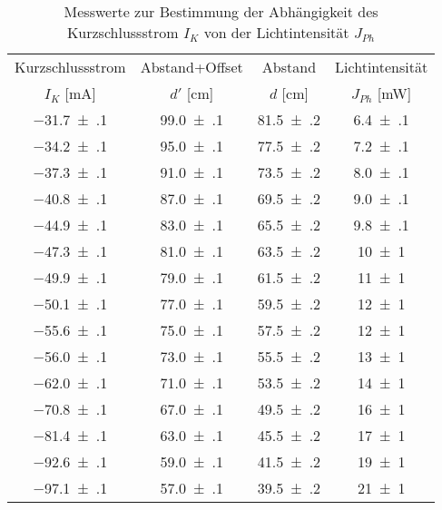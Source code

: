 \begin{table}[!h]
	\centering
	\begin{tabular}{|c|c|c|c|}
		\hline
		Kurzschlussstrom & Abstand+Offset & Abstand & Lichtintensität\\
		$I_{K}$ [\si{\milli\ampere}] & $d'$ [\si{\cm}] & $d$ [\si{\cm}] & $J_{Ph}$ [\si{\milli\watt}]\\
\hline\hline
		\num{-31.7(1)} & \num{99.0(1)} & \num{81.5(2)} & \num{6.4(1)}\\
		\num{-34.2(1)} & \num{95.0(1)} & \num{77.5(2)} & \num{7.2(1)}\\
		\num{-37.3(1)} & \num{91.0(1)} & \num{73.5(2)} & \num{8.0(1)}\\
		\num{-40.8(1)} & \num{87.0(1)} & \num{69.5(2)} & \num{9.0(1)}\\
		\num{-44.9(1)} & \num{83.0(1)} & \num{65.5(2)} & \num{9.8(1)}\\
		\num{-47.3(1)} & \num{81.0(1)} & \num{63.5(2)} & \num{10(1)}\\
		\num{-49.9(1)} & \num{79.0(1)} & \num{61.5(2)} & \num{11(1)}\\
		\num{-50.1(1)} & \num{77.0(1)} & \num{59.5(2)} & \num{12(1)}\\
		\num{-55.6(1)} & \num{75.0(1)} & \num{57.5(2)} & \num{12(1)}\\
		\num{-56.0(1)} & \num{73.0(1)} & \num{55.5(2)} & \num{13(1)}\\
		\num{-62.0(1)} & \num{71.0(1)} & \num{53.5(2)} & \num{14(1)}\\
		\num{-70.8(1)} & \num{67.0(1)} & \num{49.5(2)} & \num{16(1)}\\
		\num{-81.4(1)} & \num{63.0(1)} & \num{45.5(2)} & \num{17(1)}\\
		\num{-92.6(1)} & \num{59.0(1)} & \num{41.5(2)} & \num{19(1)}\\
		\num{-97.1(1)} & \num{57.0(1)} & \num{39.5(2)} & \num{21(1)}\\
		\hline
	\end{tabular}
	\caption{Messwerte zur Bestimmung der Abhängigkeit des Kurzschlussstrom $I_{K}$ von der Lichtintensität $J_{Ph}$ \label{tab:Auswertung_Kurzschlussstorm}}
\end{table}
